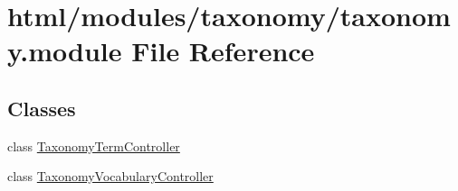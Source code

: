\hypertarget{taxonomy_8module}{
\section{html/modules/taxonomy/taxonomy.module File Reference}
\label{taxonomy_8module}
}
\subsection*{Classes}
\begin{DoxyCompactItemize}
\item 
class \hyperlink{classTaxonomyTermController}{TaxonomyTermController}
\item 
class \hyperlink{classTaxonomyVocabularyController}{TaxonomyVocabularyController}
\end{DoxyCompactItemize}
